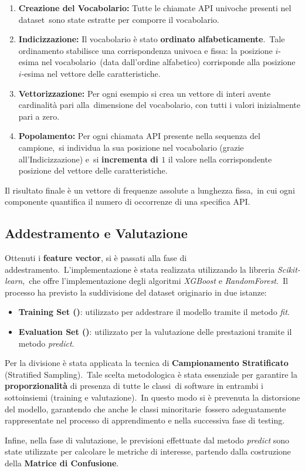 \begin{enumerate}
    \item \textbf{Creazione del Vocabolario:} Tutte le chiamate API univoche presenti nel dataset\
          sono state estratte per comporre il vocabolario.
    \item \textbf{Indicizzazione:} Il vocabolario è stato \textbf{ordinato alfabeticamente}.\
          Tale ordinamento stabilisce una corrispondenza univoca e fissa: la posizione $i$-esima nel vocabolario\
          (data dall'ordine alfabetico) corrisponde alla posizione $i$-esima nel vettore delle caratteristiche.
    \item \textbf{Vettorizzazione:} Per ogni esempio si crea un vettore di interi avente cardinalità pari alla\
          dimensione del vocabolario, con tutti i valori inizialmente pari a zero.
    \item \textbf{Popolamento:} Per ogni chiamata API presente nella sequenza del campione,\
          si individua la sua posizione nel vocabolario (grazie all'Indicizzazione) e\
          si \textbf{incrementa di $1$} il valore nella corrispondente posizione del vettore delle caratteristiche.
\end{enumerate}

Il risultato finale è un vettore di frequenze assolute a lunghezza fissa,\
in cui ogni componente quantifica il numero di occorrenze di una specifica API.

\subsection{Addestramento e Valutazione}

Ottenuti i \textbf{feature vector}, si è passati alla fase di addestramento.\
L'implementazione è stata realizzata utilizzando la libreria \textit{Scikit-learn},\
che offre l'implementazione degli algoritmi \textit{XGBoost} e \textit{RandomForest}.\
Il processo ha previsto la suddivisione del dataset originario in due istanze:
\begin{itemize}
    \item \textbf{Training Set (\percc{80})}: utilizzato per addestrare il modello tramite il metodo \textit{fit}.
    \item \textbf{Evaluation Set (\percc{20})}: utilizzato per la valutazione delle prestazioni tramite il metodo \textit{predict}.
\end{itemize}

Per la divisione è stata applicata la tecnica di \textbf{Campionamento Stratificato} (Stratified Sampling).\
Tale scelta metodologica è stata essenziale per garantire la \textbf{proporzionalità} di presenza di tutte le classi\
di software in entrambi i sottoinsiemi (training e valutazione).\
In questo modo si è prevenuta la distorsione del modello, garantendo che anche le classi minoritarie\
fossero adeguatamente rappresentate nel processo di apprendimento e nella successiva fase di testing.

Infine, nella fase di valutazione, le previsioni effettuate dal metodo \textit{predict} sono state utilizzate per calcolare le metriche di interesse, partendo dalla costruzione della \textbf{Matrice di Confusione}.